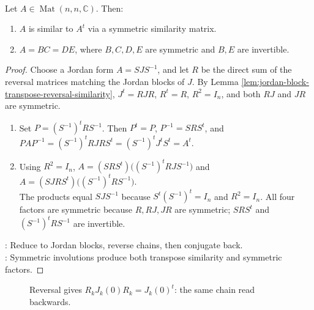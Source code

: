 \begin{theorem} \label{thm:matrix-similar-to-transpose-and-symmetric-factorizations} \\
Let $A\in\operatorname{Mat}(n,n,\mathbb{C})$. Then:
\begin{enumerate}[label=(\roman*)]
\setlength{\itemsep}{0pt}
\item $A$ is similar to $A^t$ via a symmetric similarity matrix.
\item $A=BC=DE$, where $B,C,D,E$ are symmetric and $B,E$ are invertible.
\end{enumerate}
\begin{proof}
Choose a Jordan form $A=SJS^{-1}$, and let $R$ be the direct sum of the reversal matrices matching the Jordan blocks of $J$. By Lemma \ref{lem:jordan-block-transpose-reversal-similarity}, $J^t=RJR$, $R^t=R$, $R^2=I_n$, and both $RJ$ and $JR$ are symmetric.
\begin{enumerate}[label=(\roman*)]
\setlength{\itemsep}{0pt}
\item
Set $P=(S^{-1})^tRS^{-1}$. Then $P^t=P$, $P^{-1}=SRS^t$, and $PAP^{-1}=(S^{-1})^tRJR S^t=(S^{-1})^tJ^tS^t=A^t$.
\item
Using $R^2=I_n$, $A=(SRS^t)\bigl((S^{-1})^tRJ S^{-1}\bigr)$ and $A=(SJR S^t)\bigl((S^{-1})^tR S^{-1}\bigr)$.\\
The products equal $SJS^{-1}$ because $S^t(S^{-1})^t=I_n$ and $R^2=I_n$. All four factors are symmetric because $R,RJ,JR$ are symmetric; $SRS^t$ and $(S^{-1})^tRS^{-1}$ are invertible.
\end{enumerate}
: Reduce to Jordan blocks, reverse chains, then conjugate back.\\
: Symmetric involutions produce both transpose similarity and symmetric factors.
\end{proof}
\end{theorem}

\begin{figure}[H]
  \centering
  
  \caption{Reversal gives $R_kJ_k(0)R_k=J_k(0)^t$: the same chain read backwards.}
  \label{fig:jordan-transpose-reversal}
\end{figure}

